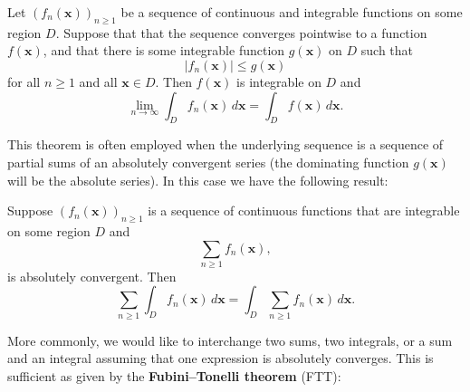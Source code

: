     \begin{theorem}
      Let $(f_{n}(\mathbf{x}))_{n \ge 1}$ be a sequence of continuous and integrable functions on some region $D$. Suppose that that the sequence converges pointwise to a function $f(\mathbf{x})$, and that there is some integrable function $g(\mathbf{x})$ on $D$ such that
      \[
        |f_{n}(\mathbf{x})| \le g(\mathbf{x})
      \]
      for all $n \ge 1$ and all $\mathbf{x} \in D$. Then $f(\mathbf{x})$ is integrable on $D$ and
      \[
        \lim_{n \to \infty}\int_{D}f_{n}(\mathbf{x})\,d\mathbf{x} = \int_{D}f(\mathbf{x})\,d\mathbf{x}.
      \]
    \end{theorem}

    This theorem is often employed when the underlying sequence is a sequence of partial sums of an absolutely convergent series (the dominating function $g(\mathbf{x})$ will be the absolute series). In this case we have the following result:

    \begin{corollary}\label{cor:DCT_for_series_and_integrals}
      Suppose $(f_{n}(\mathbf{x}))_{n \ge 1}$ is a sequence of continuous functions that are integrable on some region $D$ and
      \[
        \sum_{n \ge 1}f_{n}(\mathbf{x}),
      \]
      is absolutely convergent. Then
      \[
        \sum_{n \ge 1}\int_{D}f_{n}(\mathbf{x})\,d\mathbf{x} = \int_{D}\sum_{n \ge 1}f_{n}(\mathbf{x})\,d\mathbf{x}.
      \]
    \end{corollary}

    More commonly, we would like to interchange two sums, two integrals, or a sum and an integral assuming that one expression is absolutely converges. This is sufficient as given by the \textbf{Fubini–Tonelli theorem} (FTT):

